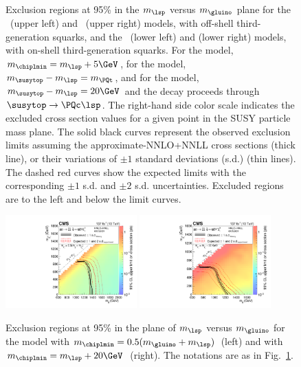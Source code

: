 \begin{figure}[!hbtp]
\caption{ Exclusion regions at 95\% \CL in the $m_{\lsp}$ versus
  $m_{\gluino}$ plane for the \Totttt~(upper left) and \TfttbbWW~(upper right) models, with off-shell third-generation squarks, and the
    \Tftttt~(lower left) and \Tfttcc (lower right) models, with on-shell third-generation squarks.
For the \TfttbbWW model, $m_{\chiplmin} = m_{\lsp} + 5\GeV$, for the \Tftttt model, $m_{\susytop} - m_{\lsp} = m_{\PQt}$, and
for the \Tfttcc model, $m_{\susytop} - m_{\lsp} = 20\GeV$ and the decay proceeds through $\susytop \to \PQc \lsp$.
The right-hand side color scale indicates the excluded cross section values for a given point in the SUSY particle mass plane.
The solid black curves represent the observed exclusion limits
assuming the approximate-NNLO+NNLL cross sections
(thick line), or their variations of $\pm 1$ standard deviations (s.d.) (thin lines).
The dashed red curves show the expected limits with the corresponding $\pm 1$ s.d. and $\pm 2$ s.d. uncertainties.
Excluded regions are to the left and below the limit curves.
}
\label{fig:t1ttxx_scan_xsec}
\end{figure}

\begin{figure}[!hbtp]
\centering
\includegraphics[width=0.45\textwidth]{figs/ssp/scan_t5qqqqvv.pdf}
\includegraphics[width=0.45\textwidth]{figs/ssp/scan_t5qqqqvvdm20.pdf}
\caption{Exclusion regions at 95\% \CL in the plane of $m_{\lsp}$ versus $m_{\gluino}$ for the \TfqqqqWZ model
with $m_{\chiplmin}=0.5(m_{\gluino} + m_{\lsp})$~(left) and with $m_{\chiplmin} = m_{\lsp} + 20\GeV$~(right).
The notations are as in Fig.~\ref{fig:t1ttxx_scan_xsec}.  }
\label{fig:t5qqqqvv_scan_xsec}
\end{figure}

